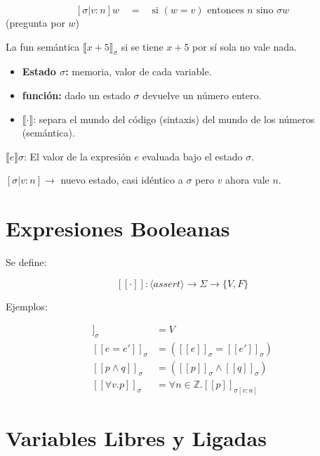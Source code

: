 \documentclass[a4paper,12pt]{article}
\begin{document}
\[
[\sigma | v : n]w \quad = \quad \text{si } (w = v) \text{ entonces } n \text{ sino } \sigma w
\] (pregunta por $w$)

\begin{tcolorbox}[title=Notaciones de autora]
\noindent La fun semántica $\llbracket x+5 \rrbracket_\sigma$ si se tiene $x + 5$ por sí sola no vale nada.

\begin{itemize}
    \item[$\hookrightarrow$] \textbf{Estado $\sigma$:} memoria, valor de cada variable.
    \item[$\hookrightarrow$] \textbf{función:} dado un estado $\sigma$ devuelve un número entero.
    \item[$\hookrightarrow$] $\llbracket \cdot \rrbracket$: separa el mundo del código (sintaxis) del mundo de los números (semántica).
\end{itemize}

\medskip

\noindent $\llbracket e \rrbracket \sigma$: El valor de la expresión $e$ evaluada bajo el estado $\sigma$.

\noindent $[\sigma | v : n] \to$ nuevo estado, casi idéntico a $\sigma$ pero $v$ ahora vale $n$.
\end{tcolorbox}
\section{Expresiones Booleanas}

Se define:

\[
[[\cdot]] : \langle assert \rangle \rightarrow \Sigma \rightarrow \{V, F\}
\]

Ejemplos:

\begin{align*}
[[true]]_\sigma &= V \\
[[e = e']]_\sigma &= ([[e]]_\sigma = [[e']]_\sigma) \\
[[p \land q]]_\sigma &= ([[p]]_\sigma \land [[q]]_\sigma) \\
[[\forall v.p]]_\sigma &= \forall n \in \mathbb{Z}. [[p]]_{\sigma[v:n]}
\end{align*}

\section{Variables Libres y Ligadas}
\end{document}
